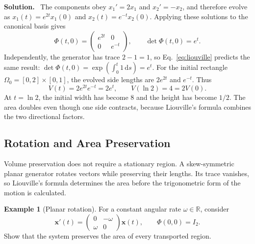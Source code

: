 \documentclass[10pt,a4paper]{article}
\newcommand{\R}{\mathbb{R}}
\newcommand{\dd}{\mathrm{d}}
\numberwithin{equation}{section}
\theoremstyle{definition}
\newtheorem{example}{Example}[section]
\newenvironment{solution}{\par\noindent\textbf{Solution.}\ }{\par}
\begin{document}
\begin{solution}
The components obey $x_1'=2x_1$ and $x_2'=-x_2$, and therefore evolve as $x_1(t)=e^{2t}x_1(0)$ and $x_2(t)=e^{-t}x_2(0)$. Applying these solutions to the canonical basis gives
\begin{equation}
\Phi(t,0)=
\begin{pmatrix}e^{2t}&0\\0&e^{-t}\end{pmatrix},
\qquad \det\Phi(t,0)=e^t.
\label{eq:ex-growth-phi}
\end{equation}
Independently, the generator has trace $2-1=1$, so Eq.~\eqref{eq:liouville} predicts the same result: $\det\Phi(t,0)=\exp(\int_0^t1\,\dd s)=e^t$. For the initial rectangle $\Omega_0=[0,2]\times[0,1]$, the evolved side lengths are $2e^{2t}$ and $e^{-t}$. Thus
\begin{equation}
V(t)=2e^{2t}e^{-t}=2e^t,
\qquad V(\ln2)=4=2V(0).
\label{eq:ex-growth-area}
\end{equation}
At $t=\ln2$, the initial width has become $8$ and the height has become $1/2$. The area doubles even though one side contracts, because Liouville's formula combines the two directional factors.
\end{solution}

\subsection{Rotation and Area Preservation}

Volume preservation does not require a stationary region. A skew-symmetric planar generator rotates vectors while preserving their lengths. Its trace vanishes, so Liouville's formula determines the area before the trigonometric form of the motion is calculated.

\begin{example}[Planar rotation]
For a constant angular rate $\omega\in\R$, consider
\begin{equation}
\mathbf{x}'(t)=
\begin{pmatrix}0&-\omega\\\omega&0\end{pmatrix}\mathbf{x}(t),
\qquad \Phi(0,0)=I_2.
\label{eq:ex-rotation-generator}
\end{equation}
Show that the system preserves the area of every transported region.
\end{example}
\end{document}

